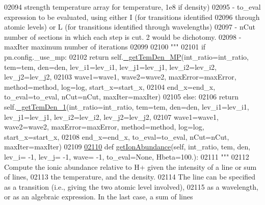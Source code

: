\begin{DoxyCode}
{{02094 \textcolor{stringliteral}{                            strength temperature array for temperature, 1e8 if density)}
02095 \textcolor{stringliteral}{            - to\_eval      expression to be evaluated, using either I (for transitions identified }
02096 \textcolor{stringliteral}{                            through atomic levels) or L (for transitions identified through wavelengths)}
02097 \textcolor{stringliteral}{            - nCut        number of sections in which each step is cut. 2 would be dichotomy.}
02098 \textcolor{stringliteral}{            - maxIter     maximum number of iterations}
02099 \textcolor{stringliteral}{}
02100 \textcolor{stringliteral}{        """}        
02101         \textcolor{keywordflow}{if} pn.config.\_use\_mp:
02102             \textcolor{keywordflow}{return} self.\hyperlink{classpyneb_1_1core_1_1pynebcore_1_1_atom_a3a7c4f43d58a5988d04cbe23ed9593ba}{\_getTemDen\_MP}(int\_ratio=int\_ratio, tem=tem, den=den, lev\_i1=lev\_i1, 
      lev\_j1=lev\_j1, lev\_i2=lev\_i2, lev\_j2=lev\_j2,
02103                   wave1=wave1, wave2=wave2, maxError=maxError, method=method, log=log, start\_x=start\_x,
02104                   end\_x=end\_x, to\_eval=to\_eval, nCut=nCut, maxIter=maxIter)
02105         \textcolor{keywordflow}{else}:
02106             \textcolor{keywordflow}{return} self.\hyperlink{classpyneb_1_1core_1_1pynebcore_1_1_atom_ad1d75f64b27a6acee079b5738b69dabe}{\_getTemDen\_1}(int\_ratio=int\_ratio, tem=tem, den=den, lev\_i1=lev\_i1, 
      lev\_j1=lev\_j1, lev\_i2=lev\_i2, lev\_j2=lev\_j2,
02107                   wave1=wave1, wave2=wave2, maxError=maxError, method=method, log=log, start\_x=start\_x,
02108                   end\_x=end\_x, to\_eval=to\_eval, nCut=nCut, maxIter=maxIter)
02109 
\hypertarget{pynebcore_8py_source_l02110}{}\hyperlink{classpyneb_1_1core_1_1pynebcore_1_1_atom_a95230eab8816f670306adceffe6f6a48}{02110}     \textcolor{keyword}{def }\hyperlink{classpyneb_1_1core_1_1pynebcore_1_1_atom_a95230eab8816f670306adceffe6f6a48}{getIonAbundance}(self, int\_ratio, tem, den, lev\_i= -1, lev\_j= -1, wave= -1, 
      to\_eval=None, Hbeta=100.):
02111         \textcolor{stringliteral}{"""}
02112 \textcolor{stringliteral}{        Compute the ionic abundance relative to H+ given the intensity of a line or sum of lines, }
02113 \textcolor{stringliteral}{        the temperature, and the density. }
02114 \textcolor{stringliteral}{        The line can be specified as a transition (i.e., giving the two atomic level involved), }
02115 \textcolor{stringliteral}{        as a wavelength, or as an algebraic expression. In the last case, a sum of lines }
}}
\end{DoxyCode}
